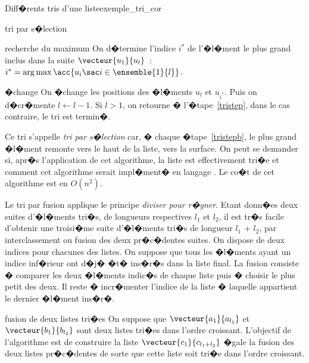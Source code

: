 \begin{xexempleprog2}{Diff�rents tris d'une liste}{exemple_tri_cor}
\begin{xalgorithm}{tri par s�lection}
            \begin{xalgostep}{recherche du maximum}\label{tristep}
            On d�termine l'indice $i^*$ de l'�l�ment le plus grand inclus dans la suite
            $\vecteur{u_1}{u_l}$~: $i^* = \arg \max \acc{ u_i \sac i \in \ensemble{1}{l}}$.
            \end{xalgostep}

            \begin{xalgostep}{�change}\label{tristepb}
            On �change les positions des �l�ments $u_l$ et $u_{i^*}$. Puis on d�cr�mente $l \longleftarrow l-1$.
            Si $l > 1$, on retourne � l'�tape~\ref{tristep}, dans le cas contraire, le tri est termin�.
            \end{xalgostep}
            \end{xalgorithm}

Ce tri s'appelle \emph{tri par s�lection} car, � chaque �tape~\ref{tristepb}, le plus grand �l�ment remonte vers le haut de la liste, vers la surface. On peut se demander si, apr�s l'application de cet algorithme, la liste est effectivement tri�e et comment cet algorithme serait impl�ment� en langage \python. Le co�t de cet algorithme est en $O(n^2)$.


\label{par_tri_fusion}

Le tri par fusion applique le principe \emph{diviser pour r�gner}. Etant donn�es deux suites d'�l�ments tri�s, de longueurs respectives $l_1$ et $l_2$, il est tr�s facile d'obtenir une troisi�me suite d'�l�ments tri�s de longueur $l_1$ + $l_2$, par interclassement ou fusion des deux pr�c�dentes suites. On dispose de deux indices pour chacunes des listes. On suppose que tous les �l�ments ayant un indice inf�rieur ont d�j� �t� ins�r�s dans la liste final. La fusion consiste � comparer les deux �l�ments indic�s de chaque liste puis � choisir le plus petit des deux. Il reste � incr�menter l'indice de la liste � laquelle appartient le dernier �l�ment ins�r�.


                \begin{xalgorithm}{fusion de deux listes tri�es}\label{algo_fusion_liste}
                On suppose que $\vecteur{a_1}{a_{l_1}}$ et $\vecteur{b_1}{b_{l_2}}$ sont deux listes tri�es dans l'ordre
                croissant. L'objectif de l'algorithme est de construire la liste
                $\vecteur{c_1}{c_{l_1+l_2}}$ �gale la fusion des deux listes pr�c�dentes de sorte que cette liste
                soit tri�e dans l'ordre croissant.
                

\end{xalgorithm}
\end{xexempleprog2}

